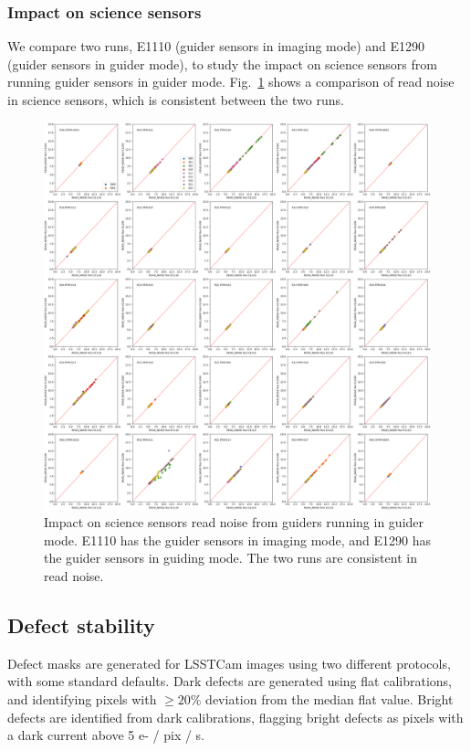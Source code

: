 \subsubsection*{Impact on science sensors}\label{sec:guiderimpactonscience}
We compare two runs, E1110 (guider sensors in imaging mode) and E1290 (guider sensors in guider mode), to study the impact on science sensors from running guider sensors in guider mode. Fig.~\ref{fig:guider_noise} shows a comparison of read noise in science sensors, which is consistent between the two runs.
\begin{figure}[ht]
    \centering
    \includegraphics[width=0.95\linewidth]{figures/E1110_E1290_READ_NOISE.png}
    \caption{Impact on science sensors read noise from guiders running in guider mode. E1110 has the guider sensors in imaging mode, and E1290 has the guider sensors in guiding mode. The two runs are consistent in read noise.}
    \label{fig:guider_noise}
\end{figure}

\subsection{Defect stability}\label{defect-stability}

Defect masks are generated for LSSTCam images using two different protocols, with some standard defaults. Dark defects are generated using flat calibrations, and identifying pixels with $\geq 20\%$ deviation from the median flat value. Bright defects are identified from dark calibrations, flagging bright defects as pixels with a dark current above 5 e- / pix / s.

